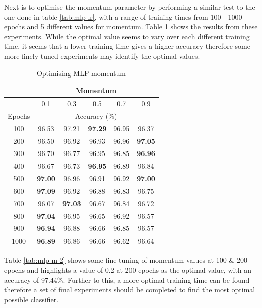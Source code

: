 \documentclass[12pt]{article}
\begin{document}
    Next is to optimise the momentum parameter by performing a similar test to the one done in table \ref{tab:mlp-lr}, with a range of training times from 100 - 1000 epochs and 5 different values for momentum. Table \ref{tab:mlp-m} shows the results from these experiments. While the optimal value seems to vary over each different training time, it seems that a lower training time gives a higher accuracy therefore some more finely tuned experiments may identify the optimal values.

    \begin{table}[H]
      \centering
      \begin{tabular}{c|ccccc}
        \toprule
              & \multicolumn{5}{c}{Momentum} \\
        \midrule
              & \multicolumn{1}{c|}{0.1} & \multicolumn{1}{c|}{0.3} & \multicolumn{1}{c|}{0.5} & \multicolumn{1}{c|}{0.7} & 0.9 \\
        \midrule
        Epochs & \multicolumn{5}{c}{Accuracy (\%)} \\
        \midrule
        100   & 96.53 & 97.21 & \textbf{97.29} & 96.95 & 96.37 \\
        200   & 96.50 & 96.92 & 96.93 & 96.96 & \textbf{97.05} \\
        300   & 96.70 & 96.77 & 96.95 & 96.85 & \textbf{96.96} \\
        400   & 96.67 & 96.73 & \textbf{96.95} & 96.89 & 96.84 \\
        500   & \textbf{97.00} & 96.96 & 96.91 & 96.92 & \textbf{97.00} \\
        600   & \textbf{97.09} & 96.92 & 96.88 & 96.83 & 96.75 \\
        700   & 96.07 & \textbf{97.03} & 96.67 & 96.84 & 96.72 \\
        800   & \textbf{97.04} & 96.95 & 96.65 & 96.92 & 96.57 \\
        900   & \textbf{96.94} & 96.88 & 96.66 & 96.85 & 96.57 \\
        1000  & \textbf{96.89} & 96.86 & 96.66 & 96.62 & 96.64 \\
        \bottomrule
      \end{tabular}%
      \caption{Optimising MLP momentum}
      \label{tab:mlp-m}%
    \end{table}%

    Table \ref{tab:mlp-m-2} shows some fine tuning of momentum values at 100 \& 200 epochs and highlights a value of 0.2 at 200 epochs as the optimal value, with an accuracy of 97.44\%. Further to this, a more optimal training time can be found therefore a set of final experiments should be completed to find the most optimal possible classifier.
\end{document}
